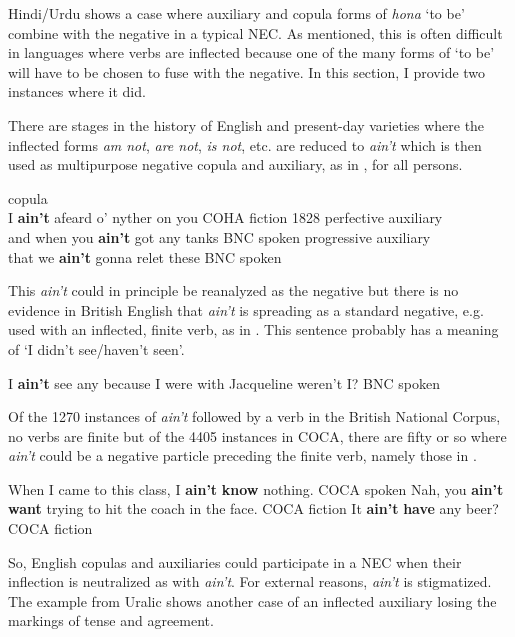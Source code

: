 ﻿\documentclass[output=paper]{langsci/langscibook}
\begin{document}
Hindi\slash Urdu shows a case where auxiliary and copula forms of
\textit{hona} `to be' combine with the negative in a typical NEC. As
mentioned, this is often difficult in languages where verbs are inflected
because one of the many forms of `to be' will have to be chosen to fuse
with the negative. In this section, I provide two instances where it did.

There are stages in the history of English and present-day varieties where
the inflected forms \textit{am not}, \textit{are not},
\textit{is not}, etc. are reduced to \textit{ain't} which is then
used as multipurpose negative copula and auxiliary, as in
, for all persons.
%
\begin{exe}\ex\label{ex:other-english-aint-stages}\begin{xlist}
    \ex copula\\
    I \textbf{ain't} afeard o' nyther on you {\ob}COHA fiction 1828{\cb}
    \jambox{}
    \ex perfective auxiliary\\
    and when you \textbf{ain't} got any tanks {\ob}BNC spoken{\cb}
    \jambox{}
    \ex progressive auxiliary \\
    that we \textbf{ain't} gonna relet these {\ob}BNC spoken{\cb}
    \jambox{}
    \end{xlist}\end{exe}
%
This \textit{ain't} could in principle be reanalyzed as the negative but
there is no evidence in British English that \textit{ain't} is spreading as
a standard negative, e.g. used with an inflected, finite verb, as in
. This sentence probably has a
meaning of `I didn't see\slash haven't seen'.
%
\begin{exe}\ex
    \label{ex:other-english-aint-Jacqueline}
      I \textbf{ain't} see any because I were with Jacqueline weren't
          I? {\ob}BNC spoken{\cb}
    \end{exe}
%
Of the 1270 instances of \textit{ain't} followed by a verb in the British
National Corpus, no verbs are finite but of the 4405 instances in COCA,
there are fifty or so where \textit{ain't} could be a negative particle
preceding the finite verb, namely those in .
%
\begin{exe}\ex\label{ex:other-english-aint-coca}\begin{xlist}
    \ex When I came to this class, I \textbf{ain't} \textbf{know} nothing. {\ob}COCA spoken{\cb}
    \ex Nah, you \textbf{ain't want} trying to hit the coach in the face. {\ob}COCA fiction{\cb}
    \ex It \textbf{ain't} \textbf{have} any beer? {\ob}COCA fiction{\cb}
    \end{xlist}\end{exe}
%
So, English copulas and auxiliaries could participate in a
NEC when their inflection is neutralized as with \textit{ain't}. For
external reasons, \textit{ain't}  is stigmatized. The example from
Uralic shows another case of an inflected auxiliary losing the
markings of tense and agreement.
\end{document}
